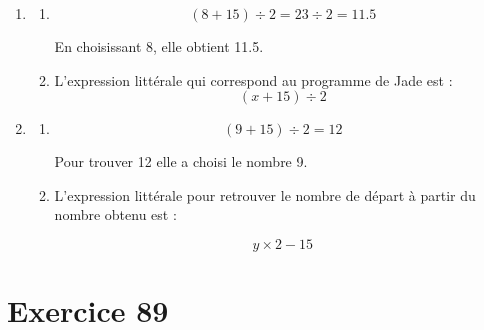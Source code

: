 \documentclass[12pt,a4paper]{article}
\begin{document}
	\begin{enumerate}[label=\arabic*)]
		\item \begin{enumerate}[label=\alph*)]
			\item \begin{equation*}
				(8 + 15) \div 2 = 23 \div 2 = \num{11.5}
			\end{equation*}
			
			En choisissant 8, elle obtient \num{11.5}.
			
			\item L'expression littérale qui correspond au programme de Jade est :\begin{equation*}
				(x + 15) \div 2
			\end{equation*}
		\end{enumerate}
	
		\item \begin{enumerate}[label=\alph*)]
			\item \begin{equation*}
				(9 + 15) \div 2 = 12
			\end{equation*} 
			
			Pour trouver 12 elle a choisi le nombre 9.
			
			
			\item L'expression littérale pour retrouver le nombre de départ à partir du nombre obtenu est :
			
				\begin{equation*}
					y \times 2 - 15
				\end{equation*}
		\end{enumerate}
		
		
		
		
		
	\end{enumerate}


	\section*{Exercice 89}
	
\end{document}
